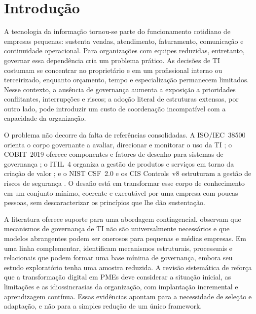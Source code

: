 \section{Introdução}
\label{sec:introducao}

A tecnologia da informação tornou-se parte do funcionamento cotidiano de empresas pequenas: sustenta vendas, atendimento, faturamento, comunicação e continuidade operacional. Para organizações com equipes reduzidas, entretanto, governar essa dependência cria um problema prático. As decisões de TI costumam se concentrar no proprietário e em um profissional interno ou terceirizado, enquanto orçamento, tempo e especialização permanecem limitados. Nesse contexto, a ausência de governança aumenta a exposição a prioridades conflitantes, interrupções e riscos; a adoção literal de estruturas extensas, por outro lado, pode introduzir um custo de coordenação incompatível com a capacidade da organização.

O problema não decorre da falta de referências consolidadas. A ISO/IEC~38500 orienta o corpo governante a avaliar, direcionar e monitorar o uso da TI \citep{iso38500_2024}; o COBIT~2019 oferece componentes e fatores de desenho para sistemas de governança \citep{isaca2018cobit}; o ITIL~4 organiza a gestão de produtos e serviços em torno da criação de valor \citep{axelos2019itil}; e o NIST CSF~2.0 e os CIS Controls~v8 estruturam a gestão de riscos de segurança \citep{nist2024csf,cis2021controls}. O desafio está em transformar esse corpo de conhecimento em um conjunto mínimo, coerente e executável por uma empresa com poucas pessoas, sem descaracterizar os princípios que lhe dão sustentação.

A literatura oferece suporte para uma abordagem contingencial. \citet{levstek2022adaptive} observam que mecanismos de governança de TI não são universalmente necessários e que modelos abrangentes podem ser onerosos para pequenas e médias empresas. Em uma linha complementar, \citet{silva2018baseline} identificam mecanismos estruturais, processuais e relacionais que podem formar uma base mínima de governança, embora seu estudo exploratório tenha uma amostra reduzida. A revisão sistemática de \citet{sagala2024transformation} reforça que a transformação digital em PMEs deve considerar a situação inicial, as limitações e as idiossincrasias da organização, com implantação incremental e aprendizagem contínua. Essas evidências apontam para a necessidade de seleção e adaptação, e não para a simples redução de um único framework.

